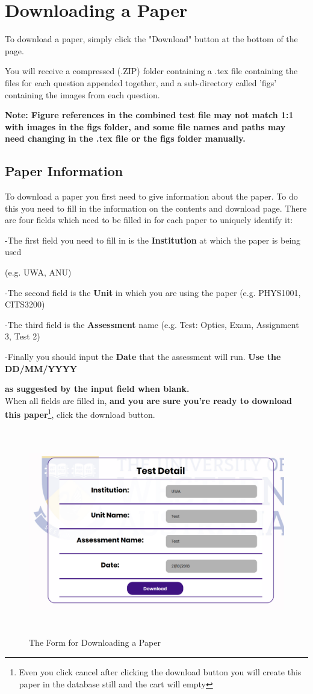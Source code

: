 \documentclass[12pt, a4paper, titlepage]{book}
\begin{document}
\section{Downloading a Paper}
To download a paper, simply click the "Download" button at the bottom of the page. \par You will receive a compressed (.ZIP) folder containing a .tex file containing the files for each question appended together, and a sub-directory called 'figs' containing the images from each question.
\par \textbf{Note: Figure references in the combined test file may not match 1:1 with images in the figs folder, and some file names and paths may need changing in the .tex file or the figs folder manually.}
\subsection{Paper Information}
To download a paper you first need to give information about the paper. To do this you need to fill in the information on the contents and download page. 	There are four fields which need to be filled in for each paper to uniquely identify it:
\small
\par -The first field you need to fill in is the \textbf{Institution }at which the paper is being used \par (e.g. UWA, ANU)
\par -The second field is the \textbf{Unit} in which you are using the paper (e.g. PHYS1001, CITS3200)
\par -The third field is the \textbf{Assessment} name (e.g. Test: Optics, Exam, Assignment 3, Test 2)
\par -Finally you should input the \textbf{Date} that the assessment will run. \textbf{Use the DD/MM/YYYY} \par \textbf{as suggested by the input field when blank.}
\normalsize
\\ When all fields are filled in, \textbf{and you are sure you're ready to download this paper}\footnote{Even you click cancel after clicking the download button you will create this paper in the database still and the cart will empty}, click the download button.
\begin{figure}[H]
\centering
\includegraphics[height = 9cm]{Downloads.PNG}
\caption{The Form for Downloading a Paper}
\end{figure}
\end{document}
